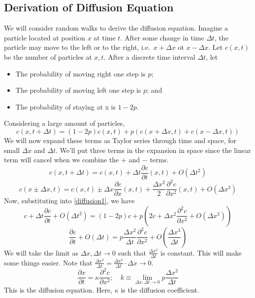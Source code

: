 \subsection{Derivation of Diffusion Equation}
We will consider random walks to derive the diffusion equation. Imagine a particle located at position \(x\) at time \(t\). After some change in time \(\Delta t\), the particle may move to the left or to the right, i.e.\ \(x+\Delta x\) ot \(x-\Delta x\). Let \(c(x, t)\) be the number of particles at \(x, t\). After a discrete time interval \(\Delta t\), let
\begin{itemize}
	\item The probability of moving right one step is \(p\);
	\item The probability of moving left one step is \(p\); and
	\item The probability of staying at x is \(1-2p\).
\end{itemize}
Considering a large amount of particles,
\begin{equation}\label{diffusion1}
	c(x, t+\Delta t) = (1-2p)c(x, t) + p\left( c(x+\Delta x, t) + c(x-\Delta x, t) \right)
\end{equation}
We will now expand these terms as Taylor series through time and space, for small \(\Delta x\) and \(\Delta t\). We'll put three terms in the expansion in space since the linear term will cancel when we combine the \(+\) and \(-\) terms.
\[ c(x, t+\Delta t) = c(x, t) + \Delta t \frac{\partial c}{\partial t}(x, t) + O(\Delta t^2) \]
\[ c(x\pm\Delta x, t) = c(x, t) \pm \Delta x \frac{\partial c}{\partial x}(x, t) + \frac{\Delta x^2}{2}\frac{\partial^2 c}{\partial x^2}(x, t) + O(\Delta x^3) \]
Now, substituting into \eqref{diffusion1}, we have
\[ c + \Delta t \frac{\partial c}{\partial t} + O(\Delta t^2) = (1-2p)c + p\left( 2c + \Delta x^2\frac{\partial^2 c}{\partial x^2} + O(\Delta x^3) \right) \]
\[ \frac{\partial c}{\partial t} + O(\Delta t) = p\frac{\Delta x^2}{\Delta t}\frac{\partial^2 c}{\partial x^2} + O\left(\frac{\Delta x^3}{\Delta t}\right) \]
We will take the limit as \(\Delta x, \Delta t \to 0\) such that \(\frac{\Delta x^2}{\Delta t}\) is constant. This will make some things easier. Note that \(\frac{\Delta x^3}{\Delta t} = \frac{\Delta x^2}{\Delta t} \cdot \Delta x \to 0\).
\[ \frac{\partial x}{\partial t} = \kappa\frac{\partial^2 c}{\partial x^2};\quad k \equiv \lim_{\Delta x,\Delta t \to 0}p\frac{\Delta x^2}{\Delta t} \]
This is the diffusion equation. Here, \(\kappa\) is the diffusion coefficient.


